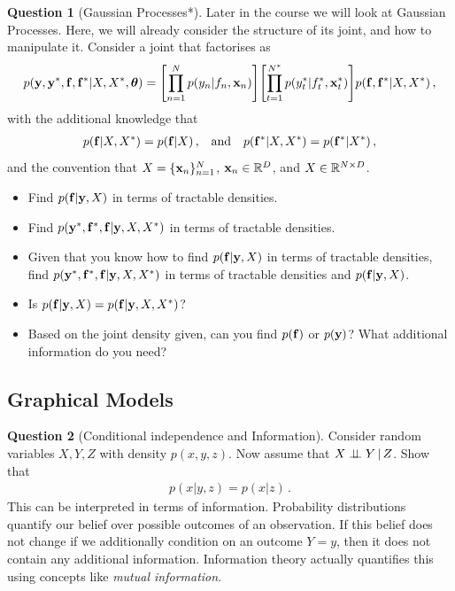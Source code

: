 \documentclass[a4paper]{article}
\theoremstyle{definition}
\newtheorem{question}{Question}
\begin{document}
\begin{question}[Gaussian Processes*]
\label{q:poe-gaussian-process}
Later in the course we will look at Gaussian Processes. Here, we will already consider the structure of its joint, and how to manipulate it. Consider a joint that factorises as
\begin{align}
p(\vy, \vy^*, \vf, \vf^*|X, X^*, \vtheta) = \left[\prod_{n=1}^N p(y_n|f_n, \vx_n)\right]\left[\prod_{t=1}^{N^*} p(y_{t}^*|f_t^*, \vx_t^*)\right] p(\vf, \vf^*|X, X^*) \,,
\end{align}
with the additional knowledge that
\begin{align}
p(\mathbf{f}|X, X^*) = p(\mathbf{f}|X)\,, && \text{and} && p(\mathbf{f}^*|X,X^*) = p(\mathbf{f}^*|X^*) \,,
\end{align}
and the convention that $X = \{\mathbf{x}_n\}_{n=1}^N$, $\mathbf{x}_n \in \mathbb{R}^D$, and $X \in \mathbb{R}^{N\times D}$.

\begin{itemize}
\item Find $p(\mathbf{f}|\mathbf{y}, X)$ in terms of tractable densities.
\item Find $p(\mathbf{y}^*, \mathbf{f}^*, \mathbf{f}|\mathbf{y}, X, X^*)$ in terms of tractable densities.
\item Given that you know how to find $p(\mathbf{f}|\mathbf{y}, X)$ in terms of tractable densities, find $p(\mathbf{y}^*, \mathbf{f}^*, \mathbf{f}|\mathbf{y}, X, X^*)$ in terms of tractable densities and $p(\mathbf{f}|\mathbf{y}, X)$.
\item Is $p(\mathbf{f}|\mathbf{y},X) = p(\mathbf{f}|\mathbf{y},X,X^*)$?
\item Based on the joint density given, can you find $p(\mathbf{f})$ or $p(\mathbf{y})$? What additional information do you need?
\end{itemize}
\end{question}




\subsection{Graphical Models}
\begin{question}[Conditional independence and Information]
Consider random variables $X,Y,Z$ with density $p(x, y,z)$. Now assume that $X\perp\!\!\!\perp Y \,|\,Z$. Show that
\begin{align}
p(x|y,z) = p(x|z) \,.
\end{align}
This can be interpreted in terms of information. Probability distributions quantify our belief over possible outcomes of an observation. If this belief does not change if we additionally condition on an outcome $Y=y$, then it does not contain any additional information. Information theory actually quantifies this using concepts like \emph{mutual information}.
\end{question}
\end{document}
